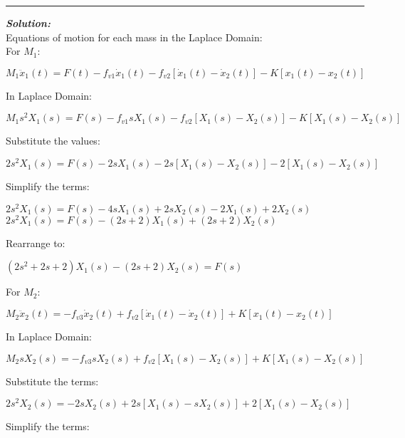 \documentclass[11pt,letterpaper]{article}
\begin{document}
\rule{\textwidth}{1pt}
\vspace{12pt}
\textit{\textbf{Solution:}}\\
Equations of motion for each mass in the Laplace Domain:\\[12pt]
For $M_1$:\\[12pt]
\begin{center}
	$M_1\ddot{x}_1(t)=F(t)-f_{v1}\dot{x}_1(t)-f_{v2}[\dot{x}_1(t)-\dot{x}_2(t)]-K[x_1(t)-x_2(t)]$\\
\end{center}
In Laplace Domain:\\
\begin{center}
	$M_1s^2X_1(s)=F(s)-f_{v1}sX_1(s)-f_{v2}[X_1(s)-X_2(s)]-K[X_1(s)-X_2(s)]$\\
\end{center}
Substitute the values:\\
\begin{center}
	$2s^2X_1(s)=F(s)-2sX_1(s)-2s[X_1(s)-X_2(s)]-2[X_1(s)-X_2(s)]$\\
\end{center}
Simplify the terms:\\
\begin{center}
	$2s^2X_1(s)=F(s)-4sX_1(s)+2sX_2(s)-2X_1(s)+2X_2(s)$\\[12pt]
	$2s^2X_1(s)=F(s)-(2s+2)X_1(s)+(2s+2)X_2(s)$\\[12pt]
\end{center}
Rearrange to:\\
\begin{center}
	$(2s^2+2s+2)X_1(s)-(2s+2)X_2(s)=F(s)$\\
\end{center}
For $M_2$:\\[12pt]
\begin{center}
	$M_2\ddot{x}_2(t)=-f_{v3}\dot{x}_2(t)+f_{v2}[\dot{x}_1(t)-\dot{x}_2(t)]+K[x_1(t)-x_2(t)]$\\
\end{center}
In Laplace Domain:\\
\begin{center}
	$M_2sX_2(s)=-f_{v3}sX_2(s)+f_{v2}[X_1(s)-X_2(s)]+K[X_1(s)-X_2(s)]$\\
\end{center}
Substitute the terms:\\
\begin{center}
	$2s^2X_2(s)=-2sX_2(s)+2s[X_1(s)-sX_2(s)]+2[X_1(s)-X_2(s)]$\\
\end{center}
Simplify the terms:\\
\end{document}
